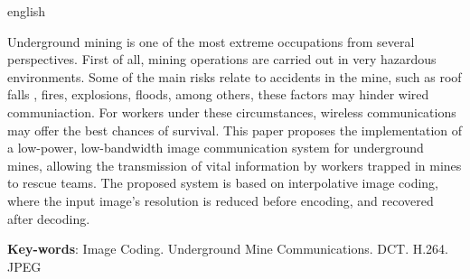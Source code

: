 \begin{resumo}[Abstract]
 \begin{otherlanguage*}{english}

Underground mining is one of the most extreme occupations from several perspectives. First of all, mining operations are carried out in very hazardous environments. Some of the main risks relate to accidents in the mine, such as roof falls , fires, explosions, floods, among others, these factors may hinder wired communiaction. For workers under these circumstances, wireless communications may offer the best chances of survival. This paper proposes the implementation of a low-power, low-bandwidth image communication system for underground mines, allowing the transmission of vital information by workers trapped in mines to rescue teams. The proposed system is based on interpolative image coding, where the input image's resolution is reduced before encoding, and recovered after decoding.
 
   \vspace{\onelineskip}
 
   \noindent 
   \textbf{Key-words}: Image Coding. Underground Mine Communications.  DCT. H.264. JPEG
    \end{otherlanguage*}
\end{resumo}
